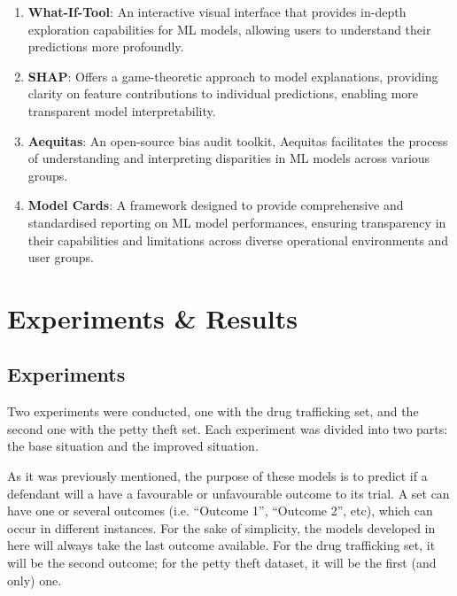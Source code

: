 \documentclass[twoside,11pt]{article}
\begin{document}
\begin{enumerate}
    \item \textbf{What-If-Tool}: An interactive visual interface that provides in-depth exploration capabilities for ML models, allowing users to understand their predictions more profoundly.
    
    \item \textbf{SHAP}: Offers a game-theoretic approach to model explanations, providing clarity on feature contributions to individual predictions, enabling more transparent model interpretability.

    \item \textbf{Aequitas}: An open-source bias audit toolkit, Aequitas facilitates the process of understanding and interpreting disparities in ML models across various groups.
    
    \item \textbf{Model Cards}: A framework designed to provide comprehensive and standardised reporting on ML model performances, ensuring transparency in their capabilities and limitations across diverse operational environments and user groups.
\end{enumerate}

\section{Experiments \& Results}
\label{results}

\subsection{Experiments}

Two experiments were conducted, one with the drug trafficking set, and the second one with the petty theft set. Each experiment was divided into two parts: the base situation and the improved situation.

As it was previously mentioned, the purpose of these models is to predict if a defendant will a have a favourable or unfavourable outcome to its trial. A set can have one or several outcomes (i.e. ``Outcome 1'', ``Outcome 2'', etc), which can occur in different instances. For the sake of simplicity, the models developed in here will always take the last outcome available. For the drug trafficking set, it will be the second outcome; for the petty theft dataset, it will be the first (and only) one.
\end{document}
